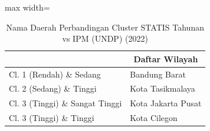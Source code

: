 \begin{table}[H]
\centering
\caption{Nama Daerah Perbandingan Cluster STATIS Tahunan vs IPM (UNDP) (2022)} \label{tab:sample2statis_ipm_name_2022}
\begin{adjustbox}{max width=\textwidth}
\begin{tabular}{|>{\centering\arraybackslash}p{4cm}|p{10cm}|}
\hline
\multicolumn{1}{|c|}{\textbf{Kategori}} & \multicolumn{1}{c|}{\textbf{Daftar Wilayah}} \\
\hline
Cl. 1 (Rendah) \& Sedang & Bandung Barat \\
\hline
Cl. 2 (Sedang) \& Tinggi & Kota Tasikmalaya \\
\hline
Cl. 3 (Tinggi) \& Sangat Tinggi & Kota Jakarta Pusat \\
\hline
Cl. 3 (Tinggi) \& Tinggi & Kota Cilegon \\
\hline
\end{tabular}
\end{adjustbox}
\end{table}